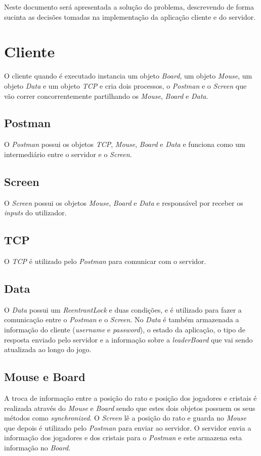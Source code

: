 \documentclass[11pt,a4paper]{report}
\begin{document}
    Neste documento será apresentada a solução do problema, descrevendo de forma sucinta as decisões tomadas na implementação da aplicação cliente e do servidor.

\chapter{Cliente}
O cliente quando é executado instancia um objeto \textit{Board}, um objeto \textit{Mouse}, um objeto \textit{Data} e um objeto \textit{TCP} e cria dois processos, o \textit{Postman} e o \textit{Screen} que vão correr concorrentemente partilhando os \textit{Mouse}, \textit{Board} e \textit{Data}.

\section{Postman}
O \textit{Postman} possui os objetos \textit{TCP}, \textit{Mouse}, \textit{Board} e \textit{Data} e funciona como um intermediário entre o servidor e o \textit{Screen}.

\section{Screen}
O \textit{Screen} possui os objetos \textit{Mouse}, \textit{Board} e \textit{Data} e responsável por receber os \textit{inputs} do utilizador.

\section{TCP}
O \textit{TCP} é utilizado pelo \textit{Postman} para comunicar com o servidor.
\section{Data}
O \textit{Data} possui um \textit{ReentrantLock} e duas condições, e é utilizado para fazer a comunicação entre o \textit{Postman} e o \textit{Screen}. No \textit{Data} é também armazenada a informação do cliente (\textit{username} e \textit{password}), o estado da aplicação, o tipo de resposta enviado pelo servidor e a informação sobre a \textit{leaderBoard} que vai sendo atualizada ao longo do jogo.

\section{Mouse e Board}
A troca de informação entre a posição do rato e posição dos jogadores e cristais é realizada através do \textit{Mouse} e \textit{Board} sendo que estes dois objetos possuem os seus métodos como \textit{synchronized}.
O \textit{Screen} lê a posição do rato e guarda no \textit{Mouse} que depois é utilizado pelo \textit{Postman} para enviar  ao servidor. O servidor envia a informação dos jogadores e dos cristais para o \textit{Postman} e este armazena esta informação no \textit{Board}.
\end{document}
